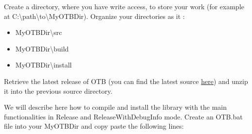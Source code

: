 Create a directory, where you have write access, to store your work (for example at C:\textbackslash path\textbackslash to\textbackslash MyOTBDir).
Organize your directories as it :
\begin{itemize}
\item MyOTBDir\textbackslash src
\item MyOTBDir\textbackslash build
\item MyOTBDir\textbackslash install
\end{itemize}

Retrieve the latest release of OTB (you can find the latest source \href{http://sourceforge.net/projects/orfeo-toolbox/files}{here}) and unzip it into the previous source directory.



We will describe here how to compile and install the library with the main functionalities in Release and ReleaseWithDebugInfo mode.
Create an OTB.bat file into your MyOTBDir and copy paste the following lines:

